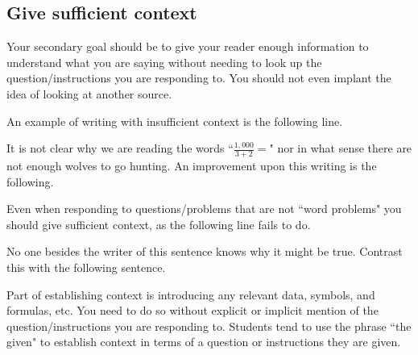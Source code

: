 \documentclass[12pt]{article}
\def\thup{\rightthumbsup}
\def\thdn{\rightthumbsdown}
\begin{document}

\subsection {\bf Give sufficient context} 
Your secondary goal should be to give your reader enough information to understand what you are saying without needing to look up the question/instructions you are responding to. You should not even implant the idea of looking at another source.


An example of writing with insufficient context is the following line.
\begin{quote}
\thdn
\end{quote}
It is not clear why we are reading the words ``$\frac{1,000}{3+2}=$" nor in what sense there are not enough wolves to go hunting. An improvement upon this writing is the following. 
\begin{quote}
\thup
\end{quote}
Even when responding to questions/problems that are not ``word problems" you should give sufficient context, as the following line fails to do.
\begin{quote}
 \thdn
\end{quote}
No one besides the writer of this sentence knows why it might be true. Contrast this with the following sentence.
\begin{quote}
\thup 
\end{quote}


Part of establishing context is introducing any relevant data, symbols, and formulas, etc. You need to do so without explicit or implicit mention of the question/instructions you are responding to.
Students tend to use the phrase ``the given" to establish context in terms of a question or instructions they are given. 
\end{document}
